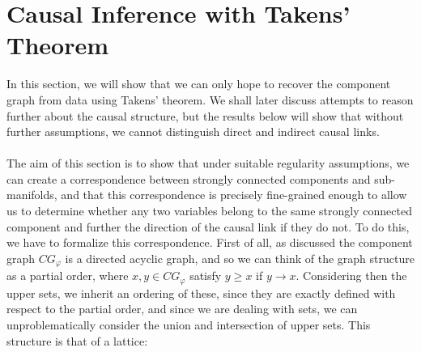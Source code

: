 \documentclass[11pt, a4paper]{memoir}
\theoremstyle{break}
\theoremstyle{break}
\theoremstyle{nonumberplain}
\begin{document}
\section{Causal Inference with Takens' Theorem}
In this section, we will show that we can only hope to recover the component graph from data using Takens' theorem. We shall later discuss attempts to reason further about the causal structure, but the results below will show that without further assumptions, we cannot distinguish direct and indirect causal links.\\\\
The aim of this section is to show that under suitable regularity assumptions, we can create a correspondence between strongly connected components and sub-manifolds, and that this correspondence is precisely fine-grained enough to allow us to determine whether any two variables belong to the same strongly connected component and further the direction of the causal link if they do not. To do this, we have to formalize this correspondence. First of all, as discussed the component graph $CG_\varphi$ is a directed acyclic graph, and so we can think of the graph structure as a partial order, where $x,y\in CG_\varphi$ satisfy $y\geqslant x$ if $y\to x$. Considering then the upper sets, we inherit an ordering of these, since they are exactly defined with respect to the partial order, and since we are dealing with sets, we can unproblematically consider the union and intersection of upper sets. This structure is that of a lattice:
\end{document}
